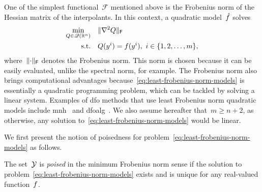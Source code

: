 One of the simplest functional~$\mathcal{F}$ mentioned above is the Frobenius norm of the Hessian matrix of the interpolants.
In this context, a quadratic model~$\objm$ solves
\begin{subequations}
    \label{eq:least-frobenius-norm-models}
    \begin{align}
        \min_{Q \in \mathscr{Q}(\mathbb{R}^n)} & \quad \lVert\nabla^2 Q\rVert_{\mathsf{F}}\\
        \text{s.t.}         & \quad Q(y^i) = f(y^i), ~ i \in \{1, 2, \dots, m\}, \label{eq:least-frobenius-norm-models-eq}
    \end{align}
\end{subequations}
where~$\lVert\cdot\rVert_{\mathsf{F}}$ denotes the Frobenius norm.
This norm is chosen because it can be easily evaluated, unlike the spectral norm, for example.
The Frobenius norm also brings computational advantages because~\cref{eq:least-frobenius-norm-models} is essentially a quadratic programming problem, which can be tackled by solving a linear system.
Examples of \gls{dfo} methods that use least Frobenius norm quadratic models include \gls{mnh}~\cite{Wild_2008} and \gls{dfoalg}~\cite{Conn_Scheinberg_Toint_1997a,Conn_Scheinberg_Toint_1997b,Conn_Scheinberg_Toint_1998}.
We also assume hereafter that~$m \ge n + 2$, as otherwise, any solution to~\cref{eq:least-frobenius-norm-models} would be linear.

We first present the notion of poisedness for problem~\cref{eq:least-frobenius-norm-models} as follows.

\begin{definition}[Poisedness]
    \label{def:poisedness}
    The set~$\xpt$ is \emph{poised} in the minimum Frobenius norm sense if the solution to problem~\cref{eq:least-frobenius-norm-models} exists and is unique for any real-valued function~$f$.
\end{definition}

